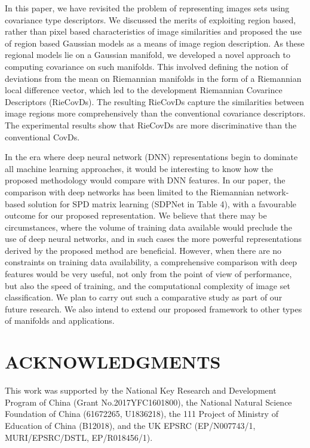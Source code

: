 \documentclass[review]{elsarticle}
\begin{document}
In this paper,  we have revisited the problem of representing images sets using covariance type descriptors. We discussed the merits of exploiting region based, rather than pixel based characteristics of image similarities and proposed the use of region based Gaussian models as a means of image region description. As these regional models lie on a Gaussian manifold, we developed a novel approach to computing covariance on such manifolds. This involved defining the notion of deviations from the mean on Riemannian manifolds in the form of a Riemannian local difference vector, which led to the development  Riemannian Covarince Descriptors (RieCovDs). The resulting RieCovDs capture the similarities between image regions more comprehensively  than the conventional covariance descriptors. The experimental results show that RieCovDs are more discriminative than the conventional CovDs. 



In the era where deep neural network (DNN) representations begin to dominate all machine learning approaches, it would be interesting to know how the proposed methodology would compare with DNN features.  In our paper, the comparison with deep networks has been limited to the Riemannian network-based solution for SPD matrix learning (SDPNet in Table 4), with a favourable outcome for our proposed representation. We believe that there may be circumstances, where the volume of training data available would preclude the use of deep neural networks, and in such cases the more powerful representations derived by the proposed method are beneficial. However, when there are no constraints on training data availability, a comprehensive comparison with deep features would be very useful, not only from the point of view of performance, but also the speed of training, and the computational complexity of image set classification. We plan to carry out such a comparative study as part of our future research. We also intend to extend our proposed framework to other types of manifolds and applications.
    

\section{ACKNOWLEDGMENTS}
This work was supported by the National Key Research and Development Program of China (Grant No.2017YFC1601800),
the National Natural Science Foundation of China (61672265, U1836218), the 111 Project of Ministry of Education of China (B12018), and the UK EPSRC (EP/N007743/1, MURI/EPSRC/DSTL, EP/R018456/1).



\end{document}
